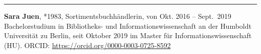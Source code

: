 \begin{center}\rule{0.5\linewidth}{0.5pt}\end{center}

\textbf{Sara Juen}, *1983, Sortimentsbuchhändlerin, von Okt. 2016 --
Sept.~2019 Bachelorstudium in Bibliotheks- und Informationswissenschaft
an der Humboldt Universität zu Berlin, seit Oktober 2019 im Master für
Informationswissenschaft (HU). ORCID:
\url{https://orcid.org/0000-0003-0725-8592}
